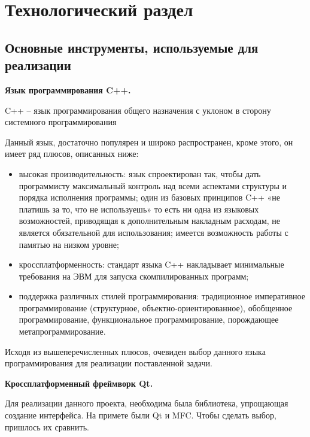 \chapter{Технологический раздел}
\label{cha:impl}


\section{Основные инструменты, используемые для реализации}

\noindent\textbf{Язык программирования C++.}

C++ -- язык программирования общего назначения с уклоном в сторону системного программирования \cite{Cpp}

Данный язык, достаточно популярен и широко распространен, кроме этого, он имеет ряд плюсов, описанных ниже:

\begin{itemize}
	\item высокая производительность: язык спроектирован так, чтобы дать программисту максимальный контроль над всеми аспектами структуры и порядка исполнения программы; один из базовых принципов C++ «не платишь за то, что не используешь» то есть ни одна из языковых возможностей, приводящая к дополнительным накладным расходам, не является обязательной для использования; имеется возможность работы с памятью на низком уровне;
	\item кроссплатформенность: стандарт языка C++ накладывает минимальные требования на ЭВМ для запуска скомпилированных программ;
	\item поддержка различных стилей программирования: традиционное императивное программирование (структурное, объектно-ориентированное), обобщенное программирование, функциональное программирование, порождающее метапрограммирование.
\end{itemize}

Исходя из вышеперечисленных плюсов, очевиден выбор данного языка программирования для реализации поставленной задачи. %

\noindent\textbf{Кроссплатформенный фреймворк Qt.}

Для реализации данного проекта, необходима была библиотека, упрощающая создание интерфейса. На примете были Qt и MFC. Чтобы сделать выбор, пришлось их сравнить. 

